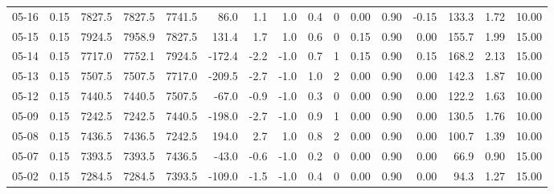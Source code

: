 \begin{threeparttable}
{\begin{tabular}{lrrrrrrrrrrrrrrr}
  05-16 &     0.15 & 7827.5 & 7827.5 & 7741.5 &       86.0 &            1.1 &                      1.0 &                 0.4 &              0 &       0.00 &      0.90 &          -0.15 &            133.3 &            1.72 &                  10.00 \\
  05-15 &     0.15 & 7924.5 & 7958.9 & 7827.5 &      131.4 &            1.7 &                      1.0 &                 0.6 &              0 &       0.15 &      0.90 &           0.00 &            155.7 &            1.99 &                  15.00 \\
  05-14 &     0.15 & 7717.0 & 7752.1 & 7924.5 &     -172.4 &           -2.2 &                     -1.0 &                 0.7 &              1 &       0.15 &      0.90 &           0.15 &            168.2 &            2.13 &                  15.00 \\
  05-13 &     0.15 & 7507.5 & 7507.5 & 7717.0 &     -209.5 &           -2.7 &                     -1.0 &                 1.0 &              2 &       0.00 &      0.90 &           0.00 &            142.3 &            1.87 &                  10.00 \\
  05-12 &     0.15 & 7440.5 & 7440.5 & 7507.5 &      -67.0 &           -0.9 &                     -1.0 &                 0.3 &              0 &       0.00 &      0.90 &           0.00 &            122.2 &            1.63 &                  10.00 \\
  05-09 &     0.15 & 7242.5 & 7242.5 & 7440.5 &     -198.0 &           -2.7 &                     -1.0 &                 0.9 &              1 &       0.00 &      0.90 &           0.00 &            130.5 &            1.76 &                  10.00 \\
  05-08 &     0.15 & 7436.5 & 7436.5 & 7242.5 &      194.0 &            2.7 &                      1.0 &                 0.8 &              2 &       0.00 &      0.90 &           0.00 &            100.7 &            1.39 &                  10.00 \\
  05-07 &     0.15 & 7393.5 & 7393.5 & 7436.5 &      -43.0 &           -0.6 &                     -1.0 &                 0.2 &              0 &       0.00 &      0.90 &           0.00 &             66.9 &            0.90 &                  15.00 \\
  05-02 &     0.15 & 7284.5 & 7284.5 & 7393.5 &     -109.0 &           -1.5 &                     -1.0 &                 0.4 &              0 &       0.00 &      0.90 &           0.00 &             94.3 &            1.27 &                  15.00 \\

\end{tabular}}
\end{threeparttable}
